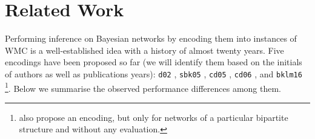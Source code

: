 \documentclass{uai2021} %
\theoremstyle{definition}
\begin{document}
\section{Related Work} \label{sec:related}

Performing inference on Bayesian networks by encoding them into instances of WMC
is a well-established idea with a history of almost twenty years. Five encodings
have been proposed so far (we will identify them based on the initials of
authors as well as publications years): \texttt{d02}
\citep{DBLP:conf/kr/Darwiche02}, \texttt{sbk05} \citep{DBLP:conf/aaai/SangBK05},
\texttt{cd05} \citep{DBLP:conf/ijcai/ChaviraD05}, \texttt{cd06}
\citep{DBLP:conf/sat/ChaviraD06}, and \texttt{bklm16}
\citep{DBLP:conf/ecai/BartKLM16}\footnote{\citet{DBLP:conf/scai/VomlelT13} also
  propose an encoding, but only for networks of a particular bipartite structure
  and without any evaluation.}. Below we summarise the observed performance
differences among them.
\end{document}
